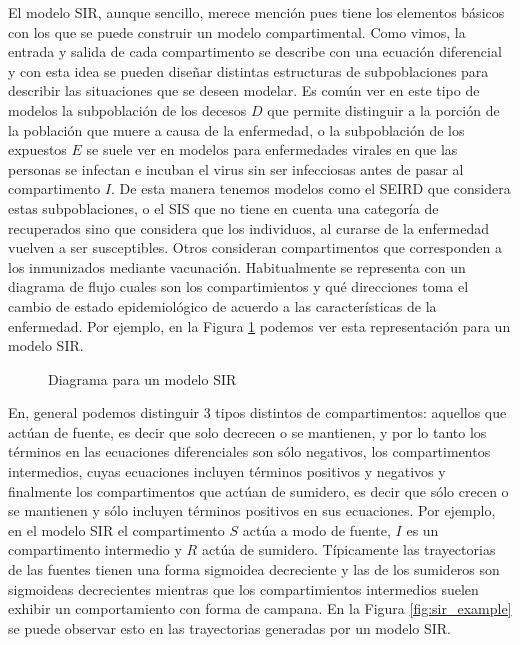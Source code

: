 El modelo SIR, aunque sencillo, merece mención pues tiene los elementos básicos con los que se puede construir un modelo compartimental. Como vimos, la entrada y salida de cada compartimento se describe con una ecuación diferencial y con esta idea se pueden diseñar distintas estructuras de subpoblaciones para describir las situaciones que se deseen modelar. Es común ver en este tipo de modelos la subpoblación de los decesos $D$ que permite distinguir a la porción de la población que muere a causa de la enfermedad, o la subpoblación de los expuestos $E$ se suele ver en modelos para enfermedades virales en que las personas se infectan e incuban el virus sin ser infecciosas antes de pasar al compartimento $I$. De esta manera tenemos modelos como el SEIRD que considera estas subpoblaciones, o el SIS que no tiene en cuenta una categoría de recuperados sino que considera que los individuos, al curarse de la enfermedad vuelven a ser susceptibles. Otros consideran compartimentos que corresponden a los inmunizados mediante vacunación. Habitualmente se representa con un diagrama de flujo cuales son los compartimientos y qué direcciones toma el cambio de estado epidemiológico de acuerdo a las características de la enfermedad. Por ejemplo, en la Figura \ref{dia:sir} podemos ver esta representación para un modelo SIR.
\begin{figure}[h]
    \centering
    \caption{Diagrama para un modelo SIR} \label{dia:sir}
\end{figure}

En, general podemos distinguir 3 tipos distintos de compartimentos: aquellos que actúan de fuente, es decir que solo decrecen o se mantienen, y por lo tanto los términos en las ecuaciones diferenciales son sólo negativos, los compartimentos intermedios, cuyas ecuaciones incluyen términos positivos y negativos y finalmente los compartimentos que actúan de sumidero, es decir que sólo crecen o se mantienen y sólo incluyen términos positivos en sus ecuaciones. Por ejemplo, en el modelo SIR el compartimento $S$ actúa a modo de fuente, $I$ es un compartimento intermedio y $R$ actúa de sumidero. Típicamente las trayectorias de las fuentes tienen una forma sigmoidea decreciente y las de los sumideros son sigmoideas decrecientes mientras que los compartimientos intermedios suelen exhibir un comportamiento con forma de campana. En la Figura \ref{fig:sir_example} se puede observar esto en las trayectorias generadas por un modelo SIR.


